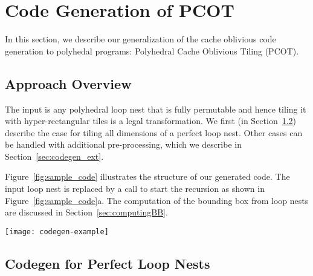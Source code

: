 \section{Code Generation of PCOT}
\label{sec:pcot}


In this section, we describe our generalization of the cache oblivious code
generation to polyhedal programs: Polyhedral Cache Oblivious Tiling (PCOT).

\subsection{Approach Overview}
The input is any polyhedral loop nest that is fully permutable and hence
tiling it with hyper-rectangular tiles is a legal transformation.  We first
(in Section~\ref{sec:perfect}) describe the case for tiling all dimensions of a
perfect loop nest.  Other cases can be handled with additional pre-processing,
which we describe in Section~\ref{sec:codegen_ext}.

Figure~\ref{fig:sample_code} illustrates the structure of our generated code.
The input loop nest is replaced by a call to start the recursion as shown in 
Figure~\ref{fig:sample_code}a. The computation of the bounding box from loop nests 
are discussed in Section~\ref{sec:computingBB}.

\begin{figure*}
  \centering
    \texttt{[image: codegen-example]}
    \caption{The structure of generated code for Heat2D stencils, which has
      loop depth $d=3$. (a) The tileable loop nest is replaced by a call to
      start the recursion. The input is the bounding box of the loop nest. (b)
      Structure of the recursive function. The input bounding box is split
      into $2^d$ new orthants by dividing each dimention in half, and the same
      function is recursively called for each new orthant. When the orthant
      reaches the input tile size, the recursion is terminated by a call to
      the base function. (c) Code for the base function that
      performs the computation of a tile in lexicographic order.  }
  \label{fig:sample_code}
\end{figure*}



\subsection{Codegen for Perfect Loop Nests}
\label{sec:perfect}

